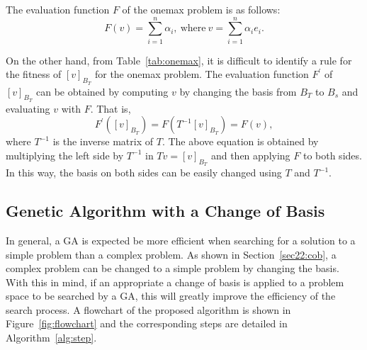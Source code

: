 The evaluation function $ F $ of the onemax problem is as follows:
\begin{equation*}
F\left(v\right)=\sum_{i=1}^{n}\alpha_i,\ \text{where}\ v=\sum_{i=1}^{n}{\alpha_ie_i}.
\end{equation*}

On the other hand, from Table~\ref{tab:onemax}, it is difficult to identify a rule for the fitness of $ \left[v\right]_{B_T} $ for the onemax problem. The evaluation function $ F^\prime $ of $ \left[v\right]_{B_T} $ can be obtained by computing $ v $ by changing the basis from $ B_T $ to $ B_s $ and evaluating $ v $ with $ F $. That is,
\begin{equation*}
F^\prime\left(\left[v\right]_{B_T}\right)=F\left(T^{-1}\left[v\right]_{B_T}\right)=F\left(v\right),
\end{equation*}
where $ T^{-1} $ is the inverse matrix of $ T $. The above equation is obtained by multiplying the left side by $ T^{-1} $ in $ Tv=\left[v\right]_{B_T} $ and then applying $ F $ to both sides. In this way, the basis on both sides can be easily changed using $ T $ and $ T^{-1} $.

\subsection{Genetic Algorithm with a Change of Basis}
In general, a GA is expected be more efficient when searching for a solution to a simple problem than a complex problem. As shown in Section~\ref{sec22:cob}, a complex problem can be changed to a simple problem by changing the basis. With this in mind, if an appropriate a change of basis is applied to a problem space to be searched by a GA, this will greatly improve the efficiency of the search process. A flowchart of the proposed algorithm is shown in Figure~\ref{fig:flowchart} and the corresponding steps are detailed in Algorithm~\ref{alg:step}.

